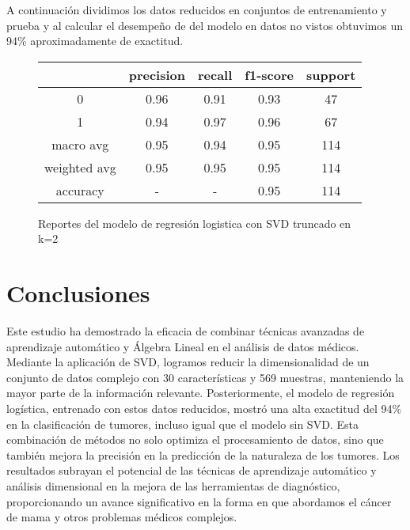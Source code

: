 \documentclass[a4paper,10pt,twocolumn]{article}
\begin{document}
A continuación dividimos los datos reducidos en conjuntos de entrenamiento y prueba y al calcular el desempeño de del modelo en datos no vistos obtuvimos un 94\% aproximadamente de exactitud.
	\begin{figure}[h!]%
		\begin{center}
			\begin{tabular}{|c|c|c|c|c|} \hline
			 			& precision 	& recall& f1-score &support	\\ \hline
			0 			&  	0.96		& 0.91 	&0.93	&47	\\ \hline
			1			& 	0.94		& 0.97	&0.96&67	\\ \hline
    
   macro avg 			&  	0.95		& 0.94 	&0.95	&114	\\ \hline
			weighted avg			& 0.95	& 0.95	&0.95&114	\\ \hline
   accuracy &- &-& 0.95&114\\ \hline
			\end{tabular}
		\caption{Reportes del modelo de regresión logistica con SVD truncado en k=2 \label{fig:ex}}
		\end{center}
		\end{figure}
   
\section{Conclusiones}
Este estudio ha demostrado la eficacia de combinar técnicas avanzadas de aprendizaje automático y Álgebra Lineal en el análisis de datos médicos. Mediante la aplicación de SVD, logramos reducir la dimensionalidad de un conjunto de datos complejo con 30 características y 569 muestras, manteniendo la mayor parte de la información relevante. Posteriormente, el modelo de regresión logística, entrenado con estos datos reducidos, mostró una alta exactitud del 94\% en la clasificación de tumores, incluso igual que el modelo sin SVD. Esta combinación de métodos no solo optimiza el procesamiento de datos, sino que también mejora la precisión en la predicción de la naturaleza de los tumores. Los resultados subrayan el potencial de las técnicas de aprendizaje automático y análisis dimensional en la mejora de las herramientas de diagnóstico, proporcionando un avance significativo en la forma en que abordamos el cáncer de mama y otros problemas médicos complejos.

		
\end{document}

